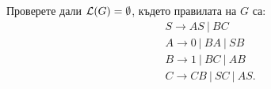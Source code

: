 \begin{problem}
  Проверете дали $\mathcal{L}(G) = \emptyset$, където правилата на $G$ са:
  \begin{align*}
    & S \to AS\ |\ BC\\
    & A \to 0\ |\ BA\ |\ SB\\
    & B \to 1\ |\ BC\ |\ AB\\
    & C \to CB\ |\ SC\ |\ AS.
  \end{align*}
\end{problem}


